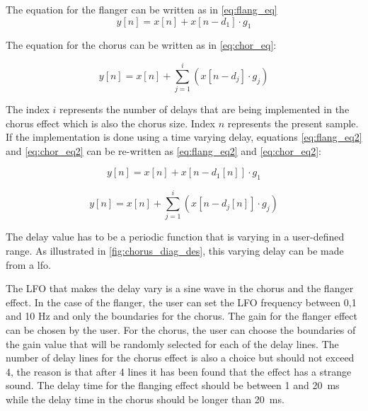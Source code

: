 The equation for the flanger can be written as in \autoref{eq:flang_eq}
\begin{equation}
\label{eq:flang_eq}
		y[n] = x[n] + x[n- d_{1}] \cdot g_{1}  
\end{equation}

The equation for the chorus can be written as in \autoref{eq:chor_eq}:

\begin{equation}
\label{eq:chor_eq}
y[n] = x[n] + \sum_{j=1}^{i}  (x[n- d_{j}] \cdot g_{j})
\end{equation}

The index $i$ represents the number of delays that are being implemented in the chorus effect which is also the chorus size. Index $n$ represents the present sample. \\
If the implementation is done using a time varying delay, equations \ref{eq:flang_eq2} and \ref{eq:chor_eq2} can be re-written as \autoref{eq:flang_eq2} and \autoref{eq:chor_eq2}:

\begin{equation}
\label{eq:flang_eq2}
y[n] = x[n] + x[n- d_{1}[n]] \cdot g_{1}  
\end{equation}

\begin{equation}
\label{eq:chor_eq2}
y[n] = x[n] + \sum_{j=1}^{i}  (x[n- d_{j}[n]] \cdot g_{j})
\end{equation}

The delay value has to be a periodic function that is varying in a user-defined range. As illustrated in \autoref{fig:chorus_diag_des}, this varying delay can be made from a \gls{lfo}.

The LFO that makes the delay vary is a sine wave in the chorus and the flanger effect. In the case of the flanger, the user can set the LFO frequency between 0,1 and 10 Hz and only the boundaries for the chorus. 
The gain for the flanger effect can be chosen by the user. For the chorus, the user can choose the boundaries of the gain value that will be randomly selected for each of the delay lines. 
The number of delay lines for the chorus effect is also a choice but should not exceed 4, the reason is that after 4 lines it has been found that the effect has a strange sound. 
The delay time for the flanging effect should be between 1 and \SI{20}{\milli\second} while the delay time in the chorus should be longer than \SI{20}{\milli\second}. 

